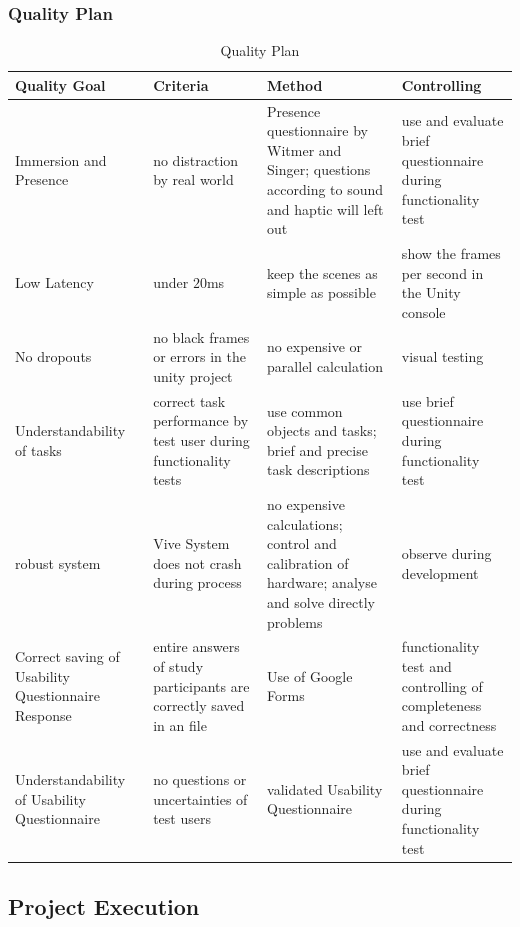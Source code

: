 \subsubsection{Quality Plan}\label{sec:PMQualityPlan}
\begin{table}[H]
	\centering
	\begin{tabular}{|p{3cm}|p{3 cm}|p{3.5 cm}|p{3.5cm}|}
		\hline
		\Absatzbox{}
		\textbf{Quality Goal}&	\textbf{Criteria} &\textbf{Method} &	\textbf{Controlling}\\ \hline
	Immersion and Presence	& no distraction by real world &	Presence questionnaire by Witmer and Singer; questions according to sound and haptic will left out	& use and evaluate brief questionnaire during functionality test\\ \hline	
Low Latency	& under $20$ms &	keep the scenes as simple as possible & show the frames per second in the Unity console\\ \hline		
No dropouts	& no black frames or errors in the unity project & no expensive or parallel calculation & visual testing\\ \hline	
Understandability of tasks	& correct task performance by test user during functionality tests & use common objects and tasks; brief and precise task descriptions & use brief questionnaire during functionality test\\ \hline	
robust system & Vive System does not crash during process & no expensive calculations; control and calibration of hardware; analyse and solve directly problems & observe during development
\\ \hline
Correct saving of Usability Questionnaire Response & entire answers of study participants are correctly saved in an file & Use of Google Forms & functionality test and controlling of completeness and correctness\\ \hline
Understandability of Usability Questionnaire & no questions or uncertainties of test users& validated Usability Questionnaire & use and evaluate brief questionnaire during functionality test\\ \hline
	\end{tabular}
	\caption[]{Quality Plan}
	\label{tab:Qaulity Plan}
\end{table}
\subsection{Project Execution} \label{sec:ProjectExecution}

